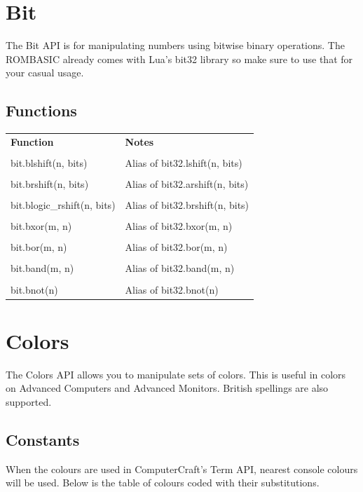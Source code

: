 \documentclass[10pt, stock]{memoir}
\let\oldsection\section
\renewcommand\section{\clearpage\oldsection}
\begin{document}
\section{Bit}

The Bit API is for manipulating numbers using bitwise binary operations. The ROMBASIC already comes with Lua's bit32 library so make sure to use that for your casual usage.

\subsection{Functions}

\begin{tabularx}{\textwidth}{l X}
	\textbf{\large Function} & \textbf{\large Notes}
	\\ \\
	\endhead
	bit.blshift(n, bits) & Alias of bit32.lshift(n, bits)
	\\ \\
	bit.brshift(n, bits) & Alias of bit32.arshift(n, bits)
	\\ \\
	bit.blogic\_rshift(n, bits) & Alias of bit32.brshift(n, bits)
	\\ \\
	bit.bxor(m, n) & Alias of bit32.bxor(m, n)
	\\ \\
	bit.bor(m, n) & Alias of bit32.bor(m, n)
	\\ \\
	bit.band(m, n) & Alias of bit32.band(m, n)
	\\ \\
	bit.bnot(n) & Alias of bit32.bnot(n)
\end{tabularx}

\section{Colors}

The Colors API allows you to manipulate sets of colors. This is useful in colors on Advanced Computers and Advanced Monitors. British spellings are also supported.

\subsection{Constants}

When the colours are used in ComputerCraft's Term API, nearest console colours will be used. Below is the table of colours coded with their substitutions.
\end{document}
